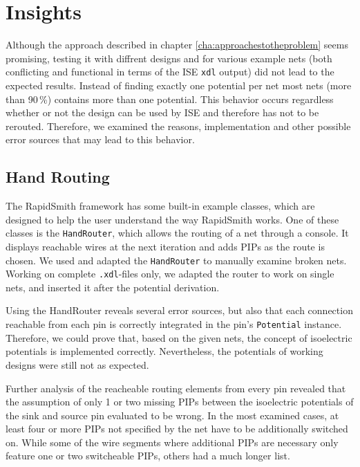 \chapter{Insights}
\label{cha:insights}

Although the approach described in chapter \ref{cha:approachestotheproblem} seems promising, testing it with diffrent designs and for various example nets (both conflicting and functional in terms of the ISE \texttt{xdl} output) did not lead to the expected results. Instead of finding exactly one potential per net most nets (more than 90\,\%) contains more than one potential. This behavior occurs regardless whether or not the design can be used by ISE and therefore has not to be rerouted.
Therefore, we examined the reasons, implementation and other possible error sources that may lead to this behavior.

\section{Hand Routing}
\label{sec:handrouting}

The RapidSmith framework has some built-in example classes, which are designed to help the user understand the way RapidSmith works. One of these classes is the \texttt{HandRouter}, which allows the routing of a net through a console. It displays reachable wires at the next iteration and adds PIPs as the route is chosen. We used and adapted the \texttt{HandRouter} to manually examine broken nets. Working on complete \texttt{.xdl}-files only, we adapted the router to work on single nets, and inserted it after the potential derivation.

Using the HandRouter reveals several error sources, but also that each connection reachable from each pin is correctly integrated in the pin's \texttt{Potential} instance. Therefore, we could prove that, based on the given nets, the concept of isoelectric potentials is implemented correctly. Nevertheless, the potentials of working designs were still not as expected.

Further analysis of the reacheable routing elements from every pin revealed that the assumption of only 1 or two missing PIPs between the isoelectric potentials of the sink and source pin evaluated to be wrong. In the most examined cases, at least four or more PIPs not specified by the net have to be additionally switched on. While some of the wire segments where additional PIPs are necessary only feature one or two switcheable PIPs, others had a much longer list. 

